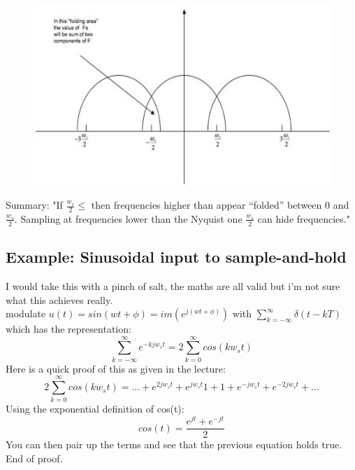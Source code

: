 \documentclass[a4paper,11pt]{article}
\begin{document}
	\FloatBarrier
	\begin{figure}[htp]
		\centering
		\includegraphics[scale=0.25]{images/aliasing_and_folding_2}
	\end{figure}
	Summary: 
	"If $\frac{w_s}{2}\leq$ then frequencies higher than appear “folded” between 0 and $\frac{w_s}{2}$. Sampling at frequencies lower than the Nyquist one $\frac{w_s}{2}$ can hide frequencies."
	\subsection{Example: Sinusoidal input to sample-and-hold}
	I would take this with a pinch of salt, the maths are all valid but i'm not sure what this achieves really.\\
	modulate $u(t)= sin(wt+\phi)=im(e^{j(wt+\phi)})$ with $\sum\limits_{k=-\infty}^{\infty}\delta(t-kT)$ which has the representation:
	\begin{equation}
		\sum\limits_{k=-\infty}^{\infty}e^{-kjw_st}= 2\sum\limits_{k=0}^{\infty}cos(kw_st)    
	\end{equation}
	Here is a quick proof of this as given in the lecture:
	\begin{equation}
		2\sum\limits_{k=0}^{\infty}cos(kw_st)= ...+e^{2jw_st}+e^{jw_st}1+1+e^{-jw_st}+ e^{-2jw_st}+...    
	\end{equation}
	Using the exponential definition of cos(t):
	\begin{equation}
		cos(t)= \frac{e^{jt}+e^{-jt}}{2} 
	\end{equation}
	You can then pair up the terms and see that the previous equation holds true.\\
	End of proof.\\\\
	
\end{document}
